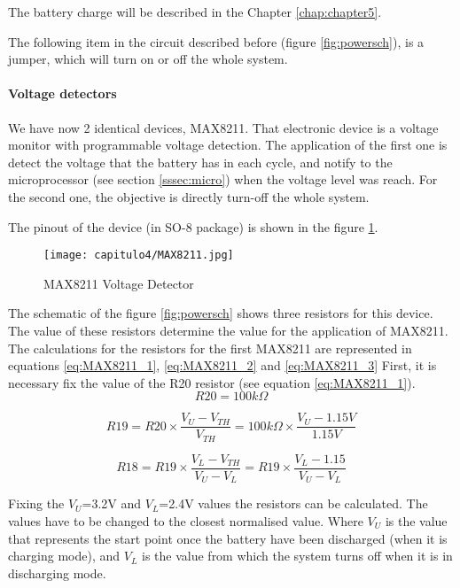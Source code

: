 The battery charge will be described in the Chapter \ref{chap:chapter5}.

The following item in the circuit described before (figure \ref{fig:powersch}), is a jumper, which will turn on or off the whole system.

\paragraph{Voltage detectors} \label{detectors}

We have now 2 identical devices, MAX8211. That electronic device is a voltage monitor with programmable voltage detection. The application of the first one is detect the voltage that the battery has in each cycle, and notify to the microprocessor (see section \ref{sssec:micro}) when the voltage level was reach. For the second one, the objective is directly turn-off the whole system. 

The pinout of the device (in SO-8 package) is shown in the figure \ref{fig:MAX8211}.

\begin{figure}[H]
	\centering
		\texttt{[image: capitulo4/MAX8211.jpg]}
	\caption{ MAX8211 Voltage Detector}
	\label{fig:MAX8211}
\end{figure}

The schematic of the figure \ref{fig:powersch} shows three resistors for this device. The value of these resistors determine the value for the application of MAX8211. The calculations for the resistors for the first MAX8211 are represented in equations \ref{eq:MAX8211_1}, \ref{eq:MAX8211_2} and \ref{eq:MAX8211_3}
 First, it is necessary fix the value of the R20 resistor (see equation \ref{eq:MAX8211_1}).
\begin{equation}
R20=100k\Omega
\label{eq:MAX8211_1}
\end{equation}

\begin{equation}
R19= R20\times \frac{V_U - V_{TH}}{V_{TH}}=100k\Omega \times \frac{V_U - 1.15V}{1.15V}
\label{eq:MAX8211_2}
\end{equation}

\begin{equation}
R18= R19\times \frac{V_L - V_{TH}}{V_U - V_{L}}=R19 \times \frac{V_L - 1.15}{V_U - V_{L}}
\label{eq:MAX8211_3}
\end{equation}

Fixing the $V_U$=3.2V and $V_L$=2.4V values the resistors can be calculated. The values have to be changed to the closest normalised value. Where $V_U$ is the value that represents the start point once the battery have been discharged (when it is charging mode), and $V_L$ 
is the value from which the system turns off when it is in discharging mode.

